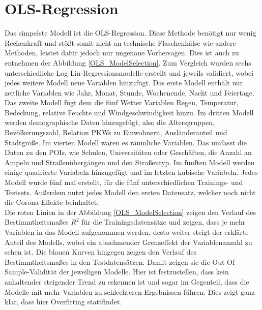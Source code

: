 \documentclass[a4paper,12pt]{thesis}
\begin{document}
\section{OLS-Regression}

Das simpelste Modell ist die OLS-Regression. Diese Methode benötigt nur wenig Rechenkraft und stößt somit nicht an technische Flaschenhälse wie andere Methoden, leistet dafür jedoch nur ungenaue Vorhersagen. Dies ist auch zu entnehmen der Abbildung \ref{OLS_ModelSelection}. Zum Vergleich wurden sechs unterschiedliche Log-Lin-Regressionsmodelle erstellt und jeweils validiert, wobei jedes weitere Modell neue Variablen hinzufügt. Das erste Modell enthält nur zeitliche Variablen wie Jahr, Monat, Stunde, Wochenende, Nacht und Feiertage. Das zweite Modell fügt dem die fünf Wetter Variablen Regen, Temperatur, Bedeckung, relative Feuchte und Windgeschwindigkeit hinzu. Im dritten Modell werden demographische Daten hinzugefügt, also die Altersgruppen, Bevölkerungszahl, Relation PKWs zu Einwohnern, Ausländeranteil und Stadtgröße. Im vierten Modell waren es räumliche Variablen. Das umfasst die Daten zu den POIs, wie Schulen, Universitäten oder Geschäften, die Anzahl an Ampeln und Straßenübergängen und den Straßentyp. Im fünften Modell werden einige quadrierte Variabeln hinzugefügt und im letzten kubische Variabeln. Jedes Modell wurde fünf mal erstellt, für die fünf unterschiedlichen Trainings- und Testsets. Außerdem nutzt jedes Modell den ersten Datensatz, welcher noch nicht die Corona-Effekte beinhaltet.\\
Die roten Linien in der Abbildung \ref{OLS_ModelSelection} zeigen den Verlauf des Bestimmtheitsmaßes $R^2$ für die Trainingsdatensätze und zeigen, dass je mehr Variablen in das Modell aufgenommen werden, desto weiter steigt der erklärte Anteil des Modells, wobei ein abnehmender Grenzeffekt der Variablenanzahl zu sehen ist. Die blauen Kurven hingegen zeigen den Verlauf des Bestimmtheitsmaßes in den Testdatensätzen. Damit zeigen sie die Out-Of-Sample-Validität der jeweiligen Modelle. Hier ist festzustellen, dass kein anhaltender steigender Trend zu erkennen ist und sogar im Gegenteil, dass die Modelle mit mehr Variablen zu schlechteren Ergebnissen führen. Dies zeigt ganz klar, dass hier Overfitting stattfindet.\\
\end{document}
